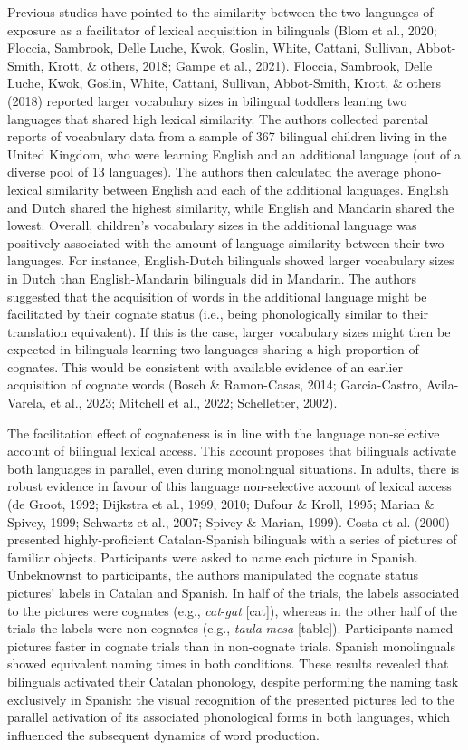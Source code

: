 \documentclass[
  12pt,
  b5paperpaper,
  twoside]{scrreprt}
\begin{document}
Previous studies have pointed to the similarity between the two
languages of exposure as a facilitator of lexical acquisition in
bilinguals (Blom et al., 2020; Floccia, Sambrook, Delle Luche, Kwok,
Goslin, White, Cattani, Sullivan, Abbot-Smith, Krott, \& others, 2018;
Gampe et al., 2021). Floccia, Sambrook, Delle Luche, Kwok, Goslin,
White, Cattani, Sullivan, Abbot-Smith, Krott, \& others (2018) reported
larger vocabulary sizes in bilingual toddlers leaning two languages that
shared high lexical similarity. The authors collected parental reports
of vocabulary data from a sample of 367 bilingual children living in the
United Kingdom, who were learning English and an additional language
(out of a diverse pool of 13 languages). The authors then calculated the
average phono-lexical similarity between English and each of the
additional languages. English and Dutch shared the highest similarity,
while English and Mandarin shared the lowest. Overall, children's
vocabulary sizes in the additional language was positively associated
with the amount of language similarity between their two languages. For
instance, English-Dutch bilinguals showed larger vocabulary sizes in
Dutch than English-Mandarin bilinguals did in Mandarin. The authors
suggested that the acquisition of words in the additional language might
be facilitated by their cognate status (i.e., being phonologically
similar to their translation equivalent). If this is the case, larger
vocabulary sizes might then be expected in bilinguals learning two
languages sharing a high proportion of cognates. This would be
consistent with available evidence of an earlier acquisition of cognate
words (Bosch \& Ramon-Casas, 2014; Garcia-Castro, Avila-Varela, et al.,
2023; Mitchell et al., 2022; Schelletter, 2002).

The facilitation effect of cognateness is in line with the language
non-selective account of bilingual lexical access. This account proposes
that bilinguals activate both languages in parallel, even during
monolingual situations. In adults, there is robust evidence in favour of
this language non-selective account of lexical access (de Groot, 1992;
Dijkstra et al., 1999, 2010; Dufour \& Kroll, 1995; Marian \& Spivey,
1999; Schwartz et al., 2007; Spivey \& Marian, 1999). Costa et al.
(2000) presented highly-proficient Catalan-Spanish bilinguals with a
series of pictures of familiar objects. Participants were asked to name
each picture in Spanish. Unbeknownst to participants, the authors
manipulated the cognate status pictures' labels in Catalan and Spanish.
In half of the trials, the labels associated to the pictures were
cognates (e.g., \emph{cat}-\emph{gat} {[}cat{]}), whereas in the other
half of the trials the labels were non-cognates (e.g.,
\emph{taula}-\emph{mesa} {[}table{]}). Participants named pictures
faster in cognate trials than in non-cognate trials. Spanish
monolinguals showed equivalent naming times in both conditions. These
results revealed that bilinguals activated their Catalan phonology,
despite performing the naming task exclusively in Spanish: the visual
recognition of the presented pictures led to the parallel activation of
its associated phonological forms in both languages, which influenced
the subsequent dynamics of word production.
\end{document}
